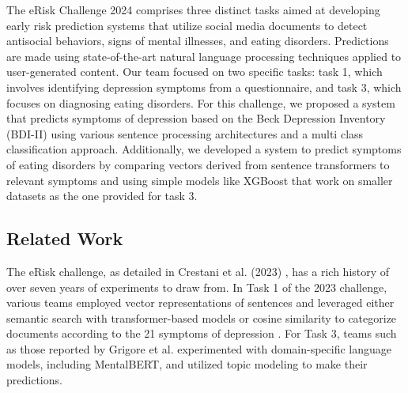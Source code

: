 \documentclass[]{style/ceurart}
\begin{document}
The eRisk Challenge 2024 \cite{parapar_overview_2023} comprises three distinct tasks aimed at developing early risk prediction systems that utilize social media documents to detect antisocial behaviors, signs of mental illnesses, and eating disorders. Predictions are made using state-of-the-art natural language processing techniques applied to user-generated content. Our team focused on two specific tasks: task 1, which involves identifying depression symptoms from a questionnaire, and task 3, which focuses on diagnosing eating disorders. For this challenge, we proposed a system that predicts symptoms of depression based on the Beck Depression Inventory (BDI-II)\cite{beck_beck_1996} using various sentence processing architectures and a multi class classification approach. Additionally, we developed a system to predict symptoms of eating disorders by comparing vectors derived from sentence transformers to relevant symptoms and using simple models like XGBoost that work on smaller datasets as the one provided for task 3.

\subsection{Related Work}



The eRisk challenge, as detailed in Crestani et al. (2023) \cite{crestani_early_2022}, has a rich history of over seven years of experiments to draw from. In Task 1 of the 2023 challenge, various teams employed vector representations of sentences and leveraged either semantic search with transformer-based models or cosine similarity to categorize documents according to the 21 symptoms of depression \cite{recharla_notebook_nodate}\cite{wang_notebook_nodate}. For Task 3, teams such as those reported by Grigore et al. \cite{grigore_notebook_nodate} experimented with domain-specific language models, including MentalBERT, and utilized topic modeling to make their predictions.
\end{document}
